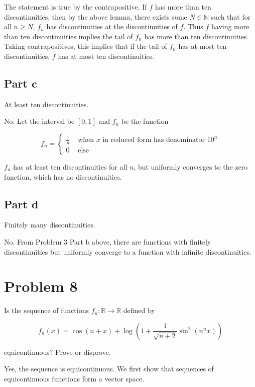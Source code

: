 \documentclass{article}
\newcommand{\R}{\mathbb{R}}
\newcommand{\N}{\mathbb{N}}
\begin{document}
The statement is true by the contrapositive. If $f$ has more than ten discontinuities, then by the above lemma, there exists some $N \in \N$ such that for all $n \geq N$, $f_n$ has discontinuities at the discontinuities of $f$. Thus $f$ having more than ten discontinuities implies the tail of $f_n$ has more than ten discontinuities. Taking contrapositives, this implies that if the tail of $f_n$ has at most ten discontinuities, $f$ has at most ten discontinuities.

\subsection*{Part c}

At least ten discontinuities.

No. Let the interval be $[0, 1]$ and $f_n$ be the function

\[
f_n = 
\begin{cases}
\frac{1}{n} & \text{ when } x \text{ in reduced form has denominator } 10^n \\
0 & \text{ else}
\end{cases}
\]

$f_n$ has at least ten discontinuities for all $n$, but uniformly converges to the zero function, which has no discontinuities.

\subsection*{Part d}

Finitely many discontinuities.

No. From Problem 3 Part b above, there are functions with finitely discontinuities but uniformly converge to a function with infinite discontinuities.

\section*{Problem 8}

Is the sequence of functions $f_n: \R \rightarrow \R$ defined by

\[
f_n(x) = \cos(n+x) + \log(1 + \frac{1}{\sqrt{n+2}} \sin^2(n^n x))
\]

equicontinuous? Prove or disprove.

Yes, the sequence is equicontinuous. We first show that sequences of equicontinuous functions form a vector space.
\end{document}
